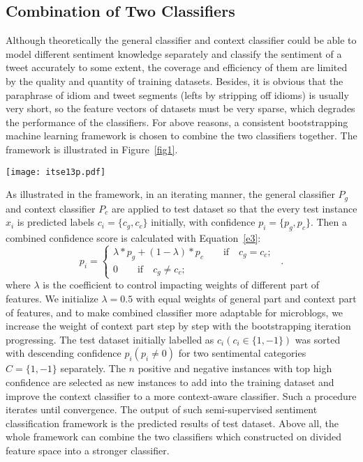 \subsection{Combination of Two Classifiers}
\label{combination}

Although theoretically the general classifier and context classifier could be able to model different sentiment knowledge separately and classify the sentiment of a tweet accurately to some extent, the coverage and efficiency of them are limited by the quality and quantity of training datasets. 
Besides, it is obvious that the paraphrase of idiom and tweet segments (lefts by stripping off idioms) is usually very short, so the feature vectors of datasets must be very sparse, which degrades the performance of the classifiers. 
For above reasons, a consistent bootstrapping machine learning framework is chosen to combine the two classifiers together. 
The framework is illustrated in Figure~\ref{fig1}. 
\begin{figure*}[!t] 
\centering%
\texttt{[image: itse13p.pdf]}
\caption{The Bootstrapping Sentiment classification Framework}
\label{fig1}
\end{figure*}
As illustrated in the framework, in an iterating manner, the general classifier $ P_{g} $ and context classifier $ P_{c} $ are applied to test dataset so that the every test instance $ x_{i} $ is predicted labels $ c_{i}=\lbrace c_{g},c_{c}\rbrace $ initially, with confidence $ p_{i}= \lbrace p_{g},p_{c}\rbrace$. 
Then a combined confidence score is calculated with Equation~\ref{e3}:
\begin{equation}
\label{e3}
p_{i}=\left\{
\begin{array}{rcl}
\lambda\ast p_{g} + \left( 1-\lambda \right) \ast p_{c} \qquad \mbox{if} \quad c_{g}=c_{c};\\
0 \qquad \mbox{if} \quad c_{g} \neq c_{c};
\end{array}
\right. \enspace .
\end{equation}
where $ \lambda $ is the coefficient to control impacting weights of different part of features. 
We initialize $ \lambda = 0.5 $ with equal weights of general part and context part of features, and to make combined classifier more adaptable for microblogs, we  increase the weight of context part step by step with the bootstrapping iteration progressing.
The test dataset initially labelled as $ c_{i} \left( c_{i} \in \lbrace 1, -1\rbrace \right)$ was sorted with descending confidence $ p_{i} \left( p_{i} \neq 0 \right) $ for two sentimental categories $ C=\lbrace 1,-1\rbrace $ separately.
The $ n $  positive and negative instances with top high confidence are selected as new instances to add into the training dataset and improve the context classifier to a more context-aware classifier. 
Such a procedure iterates until convergence.
The output of such semi-supervised sentiment classification framework is the predicted results of test dataset. 
Above all, the whole framework can combine the two classifiers which constructed on divided feature space into a stronger classifier. 

